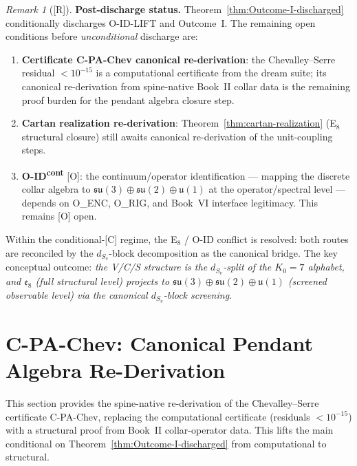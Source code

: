 \documentclass[12pt,oneside]{amsbook}
\theoremstyle{plain}
\theoremstyle{definition}
\theoremstyle{remark}
\newtheorem{remark}[theorem]{Remark}
\newcommand{\status}[1]{\textup{[#1]}}
\begin{document}
\begin{remark}[\status{R}]\label{rem:Outcome-I-status}
\textbf{Post-discharge status.}
Theorem~\ref{thm:Outcome-I-discharged} conditionally discharges
O-ID-LIFT and Outcome~I. The remaining open conditions before
\emph{unconditional} discharge are:
\begin{enumerate}[label=\textup{(\arabic*)}]
 \item \textbf{Certificate C-PA-Chev canonical re-derivation}:
 the Chevalley--Serre residual $<10^{-15}$ is a computational
 certificate from the dream suite; its canonical re-derivation
 from spine-native Book~II collar data is the remaining proof
 burden for the pendant algebra closure step.
 \item \textbf{Cartan realization re-derivation}:
 Theorem~\ref{thm:cartan-realization} (E$_8$ structural closure)
 still awaits canonical re-derivation of the unit-coupling steps.
 \item \textbf{O-ID\textsuperscript{cont}} [O]: the continuum/operator
 identification --- mapping the discrete collar algebra to
 $\mathfrak{su}(3)\oplus\mathfrak{su}(2)\oplus\mathfrak{u}(1)$
 at the operator/spectral level --- depends on O\_ENC, O\_RIG,
 and Book~VI interface legitimacy. This remains [O] open.
\end{enumerate}
Within the conditional-[C] regime, the E$_8$ / O-ID conflict is
resolved: both routes are reconciled by the $d_{S_v}$-block
decomposition as the canonical bridge. The key conceptual outcome:
\emph{the V/C/S structure is the $d_{S_v}$-split of the $K_0=7$
alphabet, and $\mathfrak{e}_8$ (full structural level) projects to
$\mathfrak{su}(3)\oplus\mathfrak{su}(2)\oplus\mathfrak{u}(1)$
(screened observable level) via the canonical $d_{S_v}$-block
screening.}
\end{remark}



\section{C-PA-Chev: Canonical Pendant Algebra Re-Derivation}
\label{sec:c-pa-chev}

This section provides the spine-native re-derivation of the
Chevalley--Serre certificate C-PA-Chev, replacing the computational
certificate (residuals $<10^{-15}$) with a structural proof from
Book~II collar-operator data. This lifts the main conditional on
Theorem~\ref{thm:Outcome-I-discharged} from computational to
structural.
\end{document}

